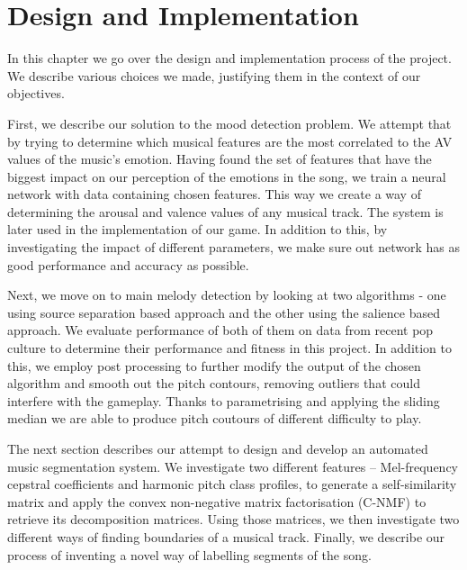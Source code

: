 
\chapter{Design and Implementation} 

\label{Chapter5} 

\fancyhead[LE,RO]{\thepage}


In this chapter we go over the design and implementation process of the project. We describe various choices we made, justifying them in the context of our objectives. 

First, we describe our solution to the mood detection problem. We attempt that by trying to determine which musical features are the most correlated to the AV values of the music's emotion. Having found the set of features that have the biggest impact on our perception of the emotions in the song, we train a neural network with data containing chosen features. This way we create a way of determining the arousal and valence values of any musical track. The system is later used in the implementation of our game. In addition to this, by investigating the impact of different parameters, we make sure out network has as good performance and accuracy as possible.

Next, we move on to main melody detection by looking at two algorithms - one using source separation based approach and the other using the salience based approach. We evaluate performance of both of them on data from recent pop culture to determine their performance and fitness in this project. In addition to this, we employ post processing to further modify the output of the chosen algorithm and smooth out the pitch contours, removing outliers that could interfere with the gameplay. Thanks to parametrising and applying the sliding median we are able to produce pitch coutours of different difficulty to play.

The next section describes our attempt to design and develop an automated music segmentation system. We investigate two different features -- Mel-frequency cepstral coefficients and harmonic pitch class profiles, to generate a self-similarity matrix and apply the convex non-negative matrix factorisation (C-NMF) to retrieve its decomposition matrices. Using those matrices, we then investigate two different ways of finding boundaries of a musical track. Finally, we describe our process of inventing a novel way of labelling segments of the song.

